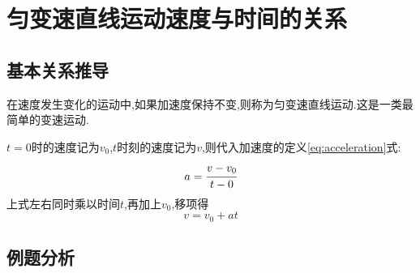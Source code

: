 \section{匀变速直线运动速度与时间的关系}
\subsection{基本关系推导}
在速度发生变化的运动中,如果加速度保持不变,则称为匀变速直线运动.这是一类最简单的变速运动.

$t=0$时的速度记为$v_0$,$t$时刻的速度记为$v$,则代入加速度的定义\eqref{eq:acceleration}式:
\[
a=\cfrac{v-v_0}{t-0}
\]
上式左右同时乘以时间$t$,再加上$v_0$,移项得
\begin{equation}
  v=v_0+at
  \label{eq:v-t}
\end{equation}

\subsection{例题分析}

